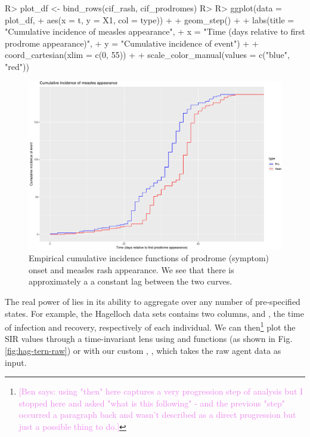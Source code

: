 \documentclass[
  shortnames]{jss}
\begin{document}
\begin{CodeChunk}
\begin{CodeInput}
R> plot_df <- bind_rows(cif_rash, cif_prodromes)
R> 
R> ggplot(data = plot_df,
+        aes(x = t, y = X1, col = type)) + 
+   geom_step() + 
+   labs(title = "Cumulative incidence of measles appearance",
+        x = "Time (days relative to first prodrome appearance)",
+        y = "Cumulative incidence of event") + 
+   coord_cartesian(xlim = c(0, 55)) +
+   scale_color_manual(values = c("blue", "red"))
\end{CodeInput}
\begin{figure}[H]

{\centering \includegraphics{Figs/unnamed-chunk-22-1} 

}

\caption{\label{fig:cifs}Empirical cumulative incidence functions of prodrome (symptom) onset and measles rash appearance.  We see that there is approximately a a constant lag between the two curves.}\label{fig:unnamed-chunk-22}
\end{figure}
\end{CodeChunk}

The real power of  lies in its ability to
aggregate over any number of pre-specified states. For example, the
Hagelloch data sets contains two columns,  and , the
time of infection and recovery, respectively of each individual. We can
then\footnote{\textcolor{violet}{[Ben says: using "then" here captures a very progression step of analysis but I stopped here and asked "what is this following" - and the previous "step" occurred a paragraph back and wasn't described as a direct progression but just a possible thing to do.]}}
plot the SIR values through a time-invariant lens using 
and  functions (as shown in Fig. \ref{fig:hag-tern-raw}) or
with our custom , , which takes the raw
agent data as input.
\end{document}
